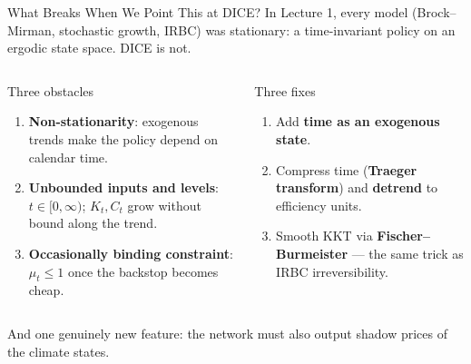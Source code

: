 \documentclass[aspectratio=169,11pt]{beamer}
\newcommand{\emphc}[1]{\textcolor{harvardcrimson}{#1}}
\begin{document}
\begin{frame}{What Breaks When We Point This at DICE?}
\footnotesize
In Lecture 1, every model (Brock--Mirman, stochastic growth, IRBC) was \emphc{stationary}: a time-invariant policy on an ergodic state space. DICE is not.

\vspace{0.2em}
\begin{columns}[T]
\begin{alertblock}{Three obstacles}
\begin{enumerate}
    \item \textbf{Non-stationarity}: exogenous trends make the policy depend on calendar time.
    \item \textbf{Unbounded inputs and levels}: $t \in [0,\infty)$; $K_t, C_t$ grow without bound along the trend.
    \item \textbf{Occasionally binding constraint}: $\mu_t \leq 1$ once the backstop becomes cheap.
\end{enumerate}
\end{alertblock}

\begin{exampleblock}{Three fixes}
\begin{enumerate}
    \item Add \textbf{time as an exogenous state}.
    \item Compress time (\textbf{Traeger transform}) and \textbf{detrend} to efficiency units.
    \item Smooth KKT via \textbf{Fischer--Burmeister} --- the same trick as IRBC irreversibility.
\end{enumerate}
\end{exampleblock}
\end{columns}

\vspace{0.3em}
And one genuinely new feature: the network must also output \emphc{shadow prices of the climate states}.
\end{frame}
\end{document}
